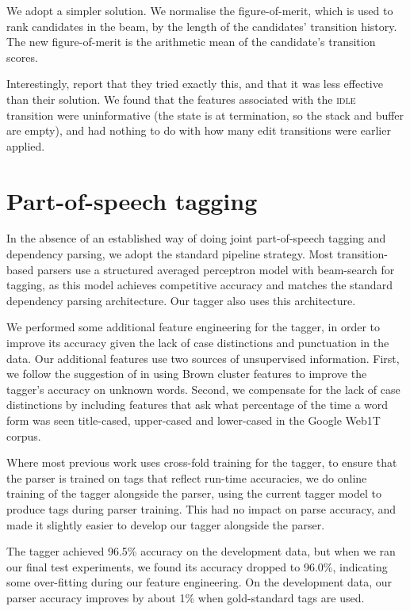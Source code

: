 \documentclass[11pt,letterpaper]{article}
\begin{document}
We adopt a simpler solution.  We normalise the figure-of-merit, which is used to rank
candidates in the beam, by the length of the candidates' transition history. The
new figure-of-merit is the
arithmetic mean of the candidate's transition scores.

Interestingly, \citet{zhang:13} report that they tried exactly this, and that it
was less effective than their solution. We found that the features
associated with the \textsc{idle} transition were uninformative (the state is at
termination, so the stack and buffer are empty), and had nothing to do with how
many edit transitions were earlier applied.

\section{Part-of-speech tagging}

In the absence of an established way of doing joint part-of-speech tagging and
dependency parsing, we adopt the standard pipeline strategy.  Most transition-based
parsers use a structured averaged perceptron model with beam-search for tagging,
as this model achieves competitive accuracy and matches the standard dependency
parsing architecture. Our tagger also uses this architecture.

We performed some additional feature engineering for the tagger, in order to
improve its accuracy given the lack of case distinctions and punctuation in
the data. Our additional features use two sources of unsupervised information.
First, we follow the suggestion of \citet{manning:11} in using Brown cluster
features to improve the tagger's accuracy on unknown words. Second, we compensate
for the lack of case distinctions by including features that ask what percentage
of the time a word form was seen title-cased, upper-cased and lower-cased in the
Google Web1T corpus. 

Where most previous work uses cross-fold training for the tagger, to ensure that the
parser is trained on tags that reflect run-time accuracies, we do online training
of the tagger alongside the parser, using the current tagger model to produce
tags during parser training.  This had no impact on parse accuracy, and made it
slightly easier to develop our tagger alongside the parser.

The tagger achieved 96.5\% accuracy on the development data, but when we ran our
final test experiments, we found its accuracy dropped to 96.0\%, indicating
some over-fitting during our feature engineering.  On the development data,
our parser accuracy improves by about 1\% when gold-standard tags are used.
\end{document}
